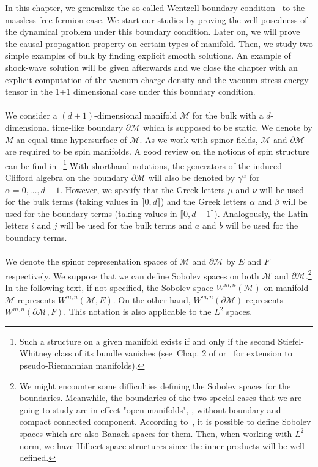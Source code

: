 In this chapter,
we generalize the so called Wentzell boundary condition~\cite{Zahn2016} to the massless free fermion case. 
We start our studies by proving the well-posedness of the dynamical problem under this boundary condition. 
Later on, we will prove the causal propagation property on certain types of manifold.
Then, we study two simple examples of bulk by finding explicit smooth solutions.
An example of shock-wave solution will be given afterwards and we close the chapter with an explicit computation of the vacuum charge density and the vacuum stress-energy tensor in the 1+1 dimensional case under this boundary condition. 
\\\\
We consider a $(d+1)$-dimensional manifold $\mathcal{M}$ for the bulk with a $d$-dimensional time-like boundary $\partial \mathcal{M}$ which is supposed to be static.
We denote by $M$ an equal-time hypersurface of $\mathcal{M}$.
As we work with spinor fields, $\mathcal{M}$ and $\partial \mathcal{M}$ are required to be spin manifolds. 
A good review on the notions of spin structure can be find in~\cite{Trautman2007}.\footnote{
Such a structure on a given manifold exists if and only if the second Stiefel-Whitney class of its bundle vanishes (see~\eg Chap. 2 of \cite{Lawson1989} or~\cite{Alagia1985} for extension to pseudo-Riemannian manifolds).}
%
With shorthand notations, the generators of the induced Clifford algebra on the boundary $\partial \mathcal{M}$ will also be denoted by $\gamma^\alpha$ for $\alpha = 0 ,\ldots, d-1$. 
However, we specify that the Greek letters $\mu$ and $\nu$ will be used for the bulk terms (taking values in $\llbracket 0, d \rrbracket$) and the Greek letters $\alpha$ and $\beta$ will be used for the boundary terms (taking values in $\llbracket 0, d-1 \rrbracket$).
Analogously, the Latin letters $i $ and $j$ will be used for the bulk terms and $a$ and $b$ will be used for the boundary terms. \\\\
%
We denote the spinor representation spaces of $\mathcal{M}$ and $\partial \mathcal{M}$ by $E$ and $F$ respectively.
We suppose that we can define Sobolev spaces on both $\mathcal{M}$ and $\partial\mathcal{M}$.\footnote{
We might encounter some difficulties defining the Sobolev spaces for the boundaries. Meanwhile, the boundaries of the two special cases that we are going to study are in effect "open manifolds", \ie, without boundary and compact connected component. 
According to~\cite{Eichhorn1996}, it is possible to define Sobolev spaces which are also Banach spaces for them.
Then, when working with $L^2$-norm, we have Hilbert space structures since the inner products will be well-defined.  
}
In the following text, if not specified, the Sobolev space $W^{m,n}(\mathcal{M})$ on manifold $\mathcal{M}$ represents $W^{m,n}(\mathcal{M}, E)$.
On the other hand, $W^{m,n}(\partial \mathcal{M})$ represents $W^{m,n}(\partial \mathcal{M}, F)$.
This notation is also applicable to the $L^2$ spaces.
%
